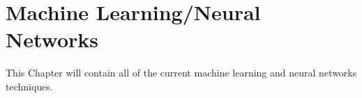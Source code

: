 \chapter{Machine Learning/Neural Networks}\label{chap_chap3}
This Chapter will contain all of the current machine learning and neural networks techniques.

